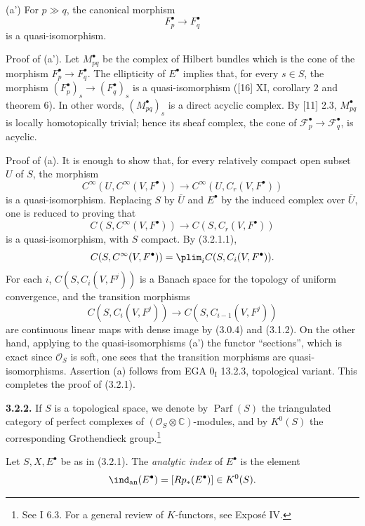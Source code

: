 \documentclass[11pt]{article}
\newcommand{\Parf}{\operatorname{Parf}}
\begin{document}
(a') For $p\gg q$, the canonical morphism
\[
 F_p^\bullet\longrightarrow F_q^\bullet
\]
is a quasi-isomorphism.

Proof of (a'). Let $M_{pq}^\bullet$ be the complex of Hilbert bundles which is the cone of the morphism $F_p^\bullet\to F_q^\bullet$. The ellipticity of $E^\bullet$ implies that, for every $s\in S$, the morphism $(F_p^\bullet)_s\to(F_q^\bullet)_s$ is a quasi-isomorphism ([16] XI, corollary 2 and theorem 6). In other words, $(M_{pq}^\bullet)_s$ is a direct acyclic complex. By [11] 2.3, $M_{pq}^\bullet$ is locally homotopically trivial; hence its sheaf complex, the cone of $\mathcal F_p^\bullet\to\mathcal F_q^\bullet$, is acyclic.

Proof of (a). It is enough to show that, for every relatively compact open subset $U$ of $S$, the morphism
\[
 C^\infty(U,C^\infty(V,F^\bullet))\longrightarrow C^\infty(U,C_r(V,F^\bullet))
\]
is a quasi-isomorphism. Replacing $S$ by $\overline U$ and $E^\bullet$ by the induced complex over $\overline U$, one is reduced to proving that
\[
 C(S,C^\infty(V,F^\bullet))\longrightarrow C(S,C_r(V,F^\bullet))
\]
is a quasi-isomorphism, with $S$ compact. By (3.2.1.1),
\[
 C(S,C^\infty(V,F^\bullet))=\plim_i C(S,C_i(V,F^\bullet)).
\]
For each $i$, $C(S,C_i(V,F^j))$ is a Banach space for the topology of uniform convergence, and the transition morphisms
\[
 C(S,C_i(V,F^j))\longrightarrow C(S,C_{i-1}(V,F^j))
\]
are continuous linear maps with dense image by (3.0.4) and (3.1.2). On the other hand, applying to the quasi-isomorphisms (a') the functor ``sections'', which is exact since $\mathcal O_S$ is soft, one sees that the transition morphisms are quasi-isomorphisms. Assertion (a) follows from EGA $0_{\mathrm I}$ 13.2.3, topological variant. This completes the proof of (3.2.1).

\textbf{3.2.2.} If $S$ is a topological space, we denote by $\Parf(S)$ the triangulated category of perfect complexes of $(\mathcal O_S\otimes\mathbb C)$-modules, and by $K^0(S)$ the corresponding Grothendieck group.\footnote{See I 6.3. For a general review of $K$-functors, see Exposé IV.}

Let $S,X,E^\bullet$ be as in (3.2.1). The \emph{analytic index} of $E^\bullet$ is the element
\[
 \ind_{\mathrm{an}}(E^\bullet)=[Rp_*(E^\bullet)]\in K^0(S).
\]
\end{document}
